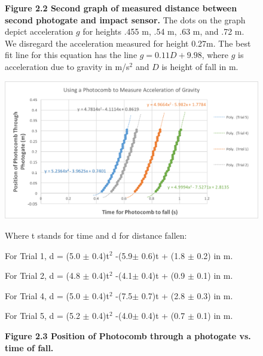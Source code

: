 \documentclass[11pt]{report}
\begin{document}
\begin{figure}[h!]
\captionsetup{labelformat=empty}
\caption{\textbf{Figure 2.2  Second graph of measured distance between second photogate and
impact sensor.} The dots on the graph depict acceleration \(g\) for heights .455 m, .54
m, .63 m, and .72 m.  We disregard the acceleration measured for height 0.27m.  
The best fit line for this equation has the line \(g = 0.11D + 9.98\), where
\(g\) is acceleration due to gravity in m/s$^2$ and \(D\) is height of fall in m.}
\end{figure}

\begin{figure}[h!]
    \includegraphics[width=\linewidth]{Photocomb1.png}
    \captionsetup{labelformat=empty}
    \caption{\textbf{Figure 2.3 Position of Photocomb through a photogate vs.
    time of fall.}} 
    Where t stands for time and d for distance fallen: 
    
    For Trial 1, d = (5.0 $\pm$ 0.4)t$^2$ -(5.9$\pm$ 0.6)t + (1.8 $\pm$ 0.2) in m.

    For Trial 2, d = (4.8 $\pm$ 0.4)t$^2$ -(4.1$\pm$ 0.4)t + (0.9 $\pm$ 0.1) in m. 

    For Trial 4, d = (5.0 $\pm$ 0.4)t$^2$ -(7.5$\pm$ 0.7)t + (2.8 $\pm$ 0.3) in m.

    For Trial 5, d = (5.2 $\pm$ 0.4)t$^2$ -(4.0$\pm$ 0.4)t + (0.7 $\pm$ 0.1) in m.

\end{figure}
\end{document}
